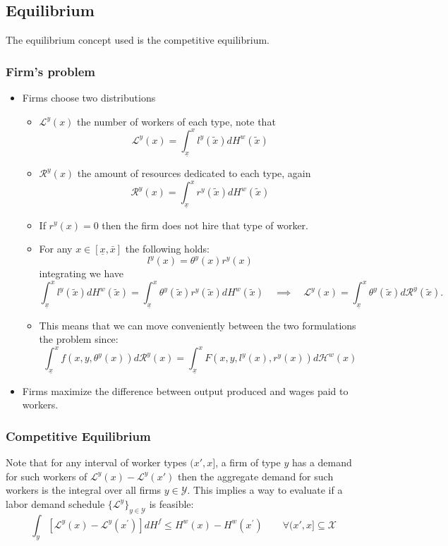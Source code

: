 \documentclass[12pt]{article}
\theoremstyle{definition}
\begin{document}
\subsection{Equilibrium}
The equilibrium concept used is the competitive equilibrium.
\subsubsection{ Firm's problem }
\begin{itemize}
    \item  Firms choose two distributions
    \begin{itemize}
    	\item   $\mathcal{L}^y(x)$ the number of workers of each type, note that $$\mathcal{L}^y(x) = \int_{\underline{x}}^xl^y(\tilde{x})dH^w(\tilde{x})$$
    	\item   $\mathcal{R}^y(x)$ the amount of resources dedicated to each type, again$$\mathcal{R}^y(x) = \int_{\underline{x}}^xr^y(\tilde{x})dH^w(\tilde{x})$$
    		\item  If $r^y(x) = 0$ then the firm does not hire that type of worker.
    	\item  For any $x\in[\underline{x}, \bar{x}]$ the following holds:$$l^y(x) = \theta^y(x)r^y(x)$$ integrating we have
    	\begin{equation}\label{labor_demand}
    	\int_{\underline{x}}^xl^y(\tilde{x})dH^w(\tilde{x}) = \int_{\underline{x}}^x\theta^y(\tilde{x})r^y(\tilde{x})dH^w(\tilde{x}) \quad \implies \quad \mathcal{L}^y(x) = \int_{\underline{x}}^x\theta^y(\tilde{x})d\mathcal{R}^y(\tilde{x}).
    	\end{equation}
        \item This means that we can move conveniently between the two formulations the problem since:
        \[\int_{\underline{x}}^{x} f\left(x, y, \theta^{y}(x)\right) d \mathcal{R}^{y}(x) = \int_{\underline{x}}^{x} F\left(x, y, l^y(x), r^y(x)\right) d \mathcal{H}^{w}(x)\]
    	\end{itemize}
    \item  Firms maximize the difference between output produced and wages paid to workers.  
\end{itemize}
\subsubsection{ Competitive Equilibrium}
Note that for any interval of worker types $(x' , x]$, a firm of type $y$ has a demand for such workers of $\mathcal{L}^y(x)-\mathcal{L}^y(x')$ then the aggregate demand for such workers is the integral over all firms $y\in \mathcal{Y}$. 
This implies a way to evaluate if a labor demand schedule $\{\mathcal{L}^y\}_{y\in \mathcal{Y}}$ is feasible:$$\int_{y}\left[\mathcal{L}^{y}(x)-\mathcal{L}^{y}\left(x^{\prime}\right)\right] d H^{f} \leq H^{w}(x)-H^{w}\left(x^{\prime}\right) \qquad \forall  (x',x]\subseteq\mathcal{X}$$
\end{document}

